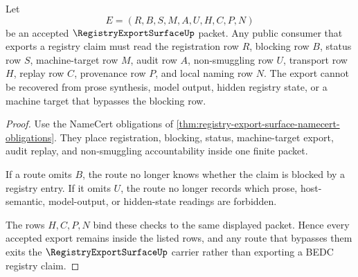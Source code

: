 \begin{theorem}
\label{thm:registry-export-surface-nonescape}
Let
$$
E=(R,B,S,M,A,U,H,C,P,N)
$$
be an accepted $\RegistryExportSurfaceUp$ packet. Any public consumer that exports a registry claim must read the registration row $R$, blocking row $B$, status row $S$, machine-target row $M$, audit row $A$, non-smuggling row $U$, transport row $H$, replay row $C$, provenance row $P$, and local naming row $N$. The export cannot be recovered from prose synthesis, model output, hidden registry state, or a machine target that bypasses the blocking row.
\end{theorem}
\begin{proof}
Use the NameCert obligations of \autoref{thm:registry-export-surface-namecert-obligations}. They place registration, blocking, status, machine-target export, audit replay, and non-smuggling accountability inside one finite packet.

If a route omits $B$, the route no longer knows whether the claim is blocked by a registry entry. If it omits $U$, the route no longer records which prose, host-semantic, model-output, or hidden-state readings are forbidden.

The rows $H,C,P,N$ bind these checks to the same displayed packet. Hence every accepted export remains inside the listed rows, and any route that bypasses them exits the $\RegistryExportSurfaceUp$ carrier rather than exporting a BEDC registry claim.
\end{proof}

